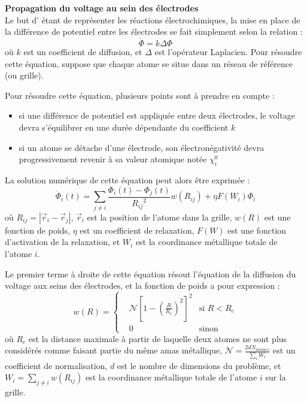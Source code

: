 \textbf{Propagation du voltage au sein des électrodes}\\
Le but d'\echemdid{} étant de représenter les réactions électrochimiques, la mise en place de la différence de potentiel entre les électrodes se fait simplement selon la relation :
\begin{equation}
    \dot{\Phi} = k \Delta \Phi
    \label{eq:echemdid_propagation}
\end{equation}
où $k$ est un coefficient de diffusion, et $\Delta$ est l'opérateur Laplacien. Pour résoudre cette équation, \echemdid{} suppose que chaque atome se situe dans un réseau de référence (ou grille).

Pour résoudre cette équation, plusieurs points sont à prendre en compte :
\begin{itemize}
    \item si une différence de potentiel est appliquée entre deux électrodes, le voltage devra s'équilibrer en une durée dépendante du coefficient $k$
    \item si un atome se détache d'une électrode, son électronégativité devra progressivement revenir à sa valeur atomique notée $\chi_i^0$
\end{itemize}

La solution numérique de cette équation peut alors être exprimée :
\begin{equation}
    \boxed%
    {
        \dot{\Phi}_i (t) = \sum_{j \neq i} \frac{\Phi_i (t) - \Phi_j (t)}{{R_{ij}}^2}w(R_{ij}) + \eta F(W_i) \Phi_i
    }
    \label{eq:echemdid_solution_numerique}
\end{equation}
où $R_{ij} = | \vec{r}_i - \vec{r}_j |$, $\vec{r}_i$ est la position de l'atome dans la grille, $w(R)$ est une fonction de poids, $\eta$ est un coefficient de relaxation, $F(W)$ est une fonction d'activation de la relaxation, et $W_i$ est la coordinance métallique totale de l'atome $i$.

Le premier terme à droite de cette équation résout l'équation de la diffusion du voltage aux seins des électrodes, et la fonction de poids a pour expression :
\begin{equation*}
    w(R) = \left\{
        \begin{aligned}
            &\mathcal{N} \left[ 1 - \left(\frac{R}{R_c}\right)^2 \right]^2 &\text{si } R < R_c\\
            &0 &\text{sinon}
        \end{aligned}
    \right.
\end{equation*}
où $R_c$ est la distance maximale à partir de laquelle deux atomes ne sont plus considérés comme faisant partie du même amas métallique, $\mathcal{N} = \frac{2 d N_{atomes}}{\sum_{i} W_i}$ est un coefficient de normalisation, $d$ est le nombre de dimensions du problème, et $W_i = \sum_{j \neq i} w(R_{ij})$ est la coordinance métallique totale de l'atome $i$ sur la grille.

